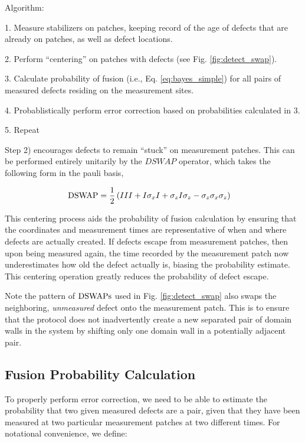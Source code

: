 \documentclass[twocolumn,superscriptaddress,aps,prb,floatfix]{revtex4-1}
\newcommand{\figref}[1]{Fig. \ref{#1}}
\begin{document}
Algorithm:

1. Measure stabilizers on patches, keeping record of the age of defects that are already on patches, as well as defect locations.

2. Perform ``centering'' on patches with defects (see \figref{fig:detect_swap}).

3. Calculate probability of fusion (i.e., Eq. \ref{eq:bayes_simple}) for all pairs of measured defects residing on the measurement sites.

4. Probablistically perform error correction based on probabilities calculated in 3.

5. Repeat

Step 2) encourages defects to remain ``stuck'' on measurement patches.  This can be performed entirely unitarily by the $DSWAP$ operator, which takes the following form in the pauli basis,

\begin{align}
\rm{DSWAP} &= \frac{1}{2} \left(III + I\sigma_x I + \sigma_z I \sigma_z - \sigma_z \sigma_x \sigma_z \right)
\end{align}


This centering process aids the probability of fusion calculation by ensuring that the coordinates and measurement times are representative of when and where defects are actually created.  If defects escape from measurement patches, then upon being measured again, the time recorded by the measurement patch now underestimates how old the defect actually is, biasing the probability estimate.  This centering operation greatly reduces the probability of defect escape.

 Note the pattern of $\rm{DSWAP}s$ used in \figref{fig:detect_swap} also swaps the neighboring, \emph{unmeasured} defect onto the measurement patch.  This is to ensure that the protocol does not inadvertently create a new separated pair of domain walls in the system by shifting only one domain wall in a potentially adjacent pair. 
 
\subsection{Fusion Probability Calculation}
\label{sec:bayes_prob_calc}


To properly perform error correction, we need to be able to estimate the probability that two given measured defects are a pair, given that they have been measured at two particular measurement patches at two different times.  For notational convenience, we define:
\end{document}
